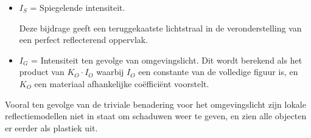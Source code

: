 \documentclass{report}
\begin{document}
\begin{enumerate}
{\begin{itemize}
\begin{itemize}
					Deze bijdrage veronderstelt een ideaal mat oppervlak, en is bijgevolg enkel afhankelijk van de invallende lichtintensiteit $I_L$, de afstand $R$ van het oogpunt tot het oppervlak, en de hoek $\theta$ tussen de invallende lichtstraal $L$ en de normaal $N$ op het oppervlak.

				\item \textbf{$I_S$} = Spiegelende intensiteit.

					Deze bijdrage geeft een teruggekaatste lichtstraal in de veronderstelling van een perfect reflecterend oppervlak. 

				\item \textbf{$I_G$} = Intensiteit ten gevolge van omgevingslicht. Dit wordt berekend als het product van $K_O \cdot I_O$ waarbij $I_O$ een constante van de volledige figuur is, en $K_O$ een materiaal afhankelijke coëfficiënt voorstelt.
				


			\end{itemize}
			Vooral ten gevolge van de triviale benadering voor het omgevingslicht zijn lokale reflectiemodellen niet in staat om schaduwen weer te geven, en zien alle objecten er eerder als plastiek uit.
		\end{itemize}
		}
	
			 
			
\end{enumerate}
\end{document}
